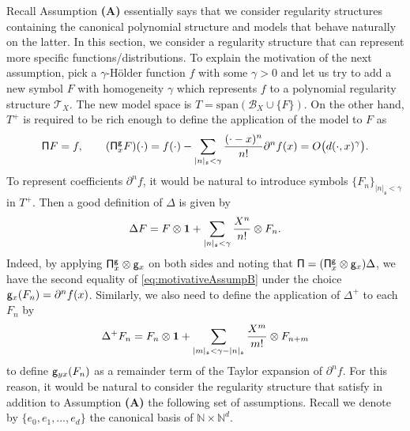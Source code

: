 \documentclass[10pt, reqno]{amsart}
\numberwithin{subsection}{section}
\numberwithin{subsubsection}{subsection}
\numberwithin{equation}{section} %
\theoremstyle{mystyle}
\theoremstyle{mystyle2}
\theoremstyle{mystyle3}
\newcommand{\REFA}{\textbf{\textsf{(A)}}}
\newcommand\bbN{\mathbb{N}}
\newcommand{\mcB}{\mathcal{B}}
\begin{document}
Recall Assumption {\REFA} essentially says that we consider regularity structures containing the canonical polynomial structure and models that behave naturally on the latter. In this section, we consider a regularity structure that can represent more specific functions/distributions. To explain the motivation of the next assumption, pick a $\gamma$-H\"older function $f$ with some $\gamma>0$ and let us try to add a new symbol $F$ with homogeneity $\gamma$ which represents $f$ to a polynomial regularity structure $\mathscr{T}_X$. The new model space is $T=\text{span}(\mcB_X\cup\{F\})$.
On the other hand, $T^+$ is required to be rich enough to define the application of the model to $F$ as
\begin{equation}\label{eq:motivativeAssumpB}
{\sf \Pi}F=f,\qquad
({\sf\Pi}_x^{\sf g}F)(\cdot)=f(\cdot)-\sum_{|n|_{\mathfrak{s}}<\gamma}\frac{(\cdot-x)^n}{n!}\partial^nf(x)
=O\big(d(\cdot,x)^\gamma\big).
\end{equation}
To represent coefficients $\partial^nf$, it would be natural to introduce symbols $\{F_n\}_{|n|_{\mathfrak{s}}<\gamma}$ in $T^+$. Then a good definition of $\Delta$ is given by
$$
\Delta F=F\otimes{\bf1}+\sum_{|n|_{\mathfrak{s}}<\gamma}\frac{X^n}{n!}\otimes F_n.
$$
Indeed, by applying ${\sf\Pi}_x^{\sf g}\otimes{\sf g}_x$ on both sides and noting that ${\sf \Pi}=({\sf\Pi}_x^{\sf g}\otimes{\sf g}_x)\Delta$, we have the second equality of \eqref{eq:motivativeAssumpB} under the choice ${\sf g}_x(F_n)=\partial^nf(x)$.
Similarly, we also need to define the application of $\Delta^+$ to each $F_n$ by
$$
\Delta^+ F_n=F_n\otimes{\bf1}+\sum_{|m|_{\mathfrak{s}}<\gamma-|n|_{\mathfrak{s}}}\frac{X^m}{m!}\otimes F_{n+m}
$$
to define ${\sf g}_{yx}(F_n)$ as a remainder term of the Taylor expansion of $\partial^nf$. For this reason, it would be natural to consider the regularity structure that satisfy in addition to Assumption {\REFA} the following set of assumptions. Recall we denote by $\{e_0,e_1,\dots,e_d\}$ the canonical basis of $\bbN\times\bbN^d$.

\medskip
\end{document}
